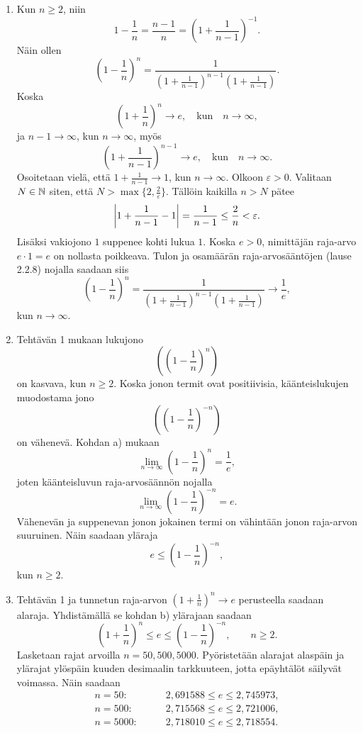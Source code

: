 \documentclass[11pt,a4paper]{amsart}
\begin{document}
\begin{solution}
\leavevmode\par
\begin{enumerate}[label=\alph*), nosep]
\item Kun \(n \geq 2\), niin
  \[
    1 - \frac{1}{n} = \frac{n - 1}{n} = \left(1 + \frac{1}{n - 1}\right)^{-1}.
  \]
  Näin ollen
  \[
    \left(1 - \frac{1}{n}\right)^n = \frac{1}{
      \left(1 + \frac{1}{n - 1}\right)^{n - 1}\left(1 + \frac{1}{n - 1}\right)
    }.
  \]
  Koska
  \[
    \left(1 + \frac{1}{n}\right)^n \to e, \quad \text{kun} \quad n \to \infty,
  \]
  ja \(n - 1 \to \infty\), kun \(n \to \infty\), myös
  \[
    \left(1 + \frac{1}{n - 1}\right)^{n - 1} \to e, \quad \text{kun}
    \quad n \to \infty.
  \]
  Osoitetaan vielä, että \(1 + \frac{1}{n - 1} \to 1\), kun \(n \to \infty\).
  Olkoon \(\varepsilon > 0\). Valitaan \(N \in \NN\) siten, että
  \(N > \max\{2, \frac{2}{\varepsilon}\}\). Tällöin kaikilla \(n > N\) pätee
  \[
    \abs*{1 + \frac{1}{n - 1} - 1} = \frac{1}{n - 1} \leq \frac{2}{n}
    < \varepsilon.
  \]
  Lisäksi vakiojono \(1\) suppenee kohti lukua \(1\).
  Koska \(e > 0\), nimittäjän raja-arvo \(e \cdot 1 = e\) on nollasta
  poikkeava. Tulon ja osamäärän raja-arvosääntöjen (lause 2.2.8) nojalla
  saadaan siis
  \[
    \left(1 - \frac{1}{n}\right)^n = \frac{1}{
      \left(1 + \frac{1}{n - 1}\right)^{n - 1}\left(1 + \frac{1}{n - 1}\right)
    } \to \frac{1}{e},
  \]
  kun \(n \to \infty\).
\item Tehtävän 1 mukaan lukujono
  \[
    \left(\left(1 - \frac{1}{n}\right)^n\right)
  \]
  on kasvava, kun \(n \geq 2\). Koska jonon termit ovat positiivisia,
  käänteislukujen muodostama jono
  \[
    \left(\left(1 - \frac{1}{n}\right)^{-n}\right)
  \]
on vähenevä. Kohdan a) mukaan
\[
  \lim_{n \to \infty} \left(1 - \frac{1}{n}\right)^n =
  \frac{1}{e},
\]
joten käänteisluvun raja-arvosäännön nojalla
\[
  \lim_{n \to \infty} \left(1 - \frac{1}{n}\right)^{-n} = e.
\]
Vähenevän ja suppenevan jonon jokainen termi on vähintään jonon
raja-arvon suuruinen. Näin saadaan yläraja
\[
  e \leq \left(1 - \frac{1}{n}\right)^{-n},
\]
kun \(n \geq 2\).
\item Tehtävän 1 ja tunnetun raja-arvon
\(\left(1 + \frac{1}{n}\right)^n \to e\) perusteella saadaan alaraja.
Yhdistämällä se kohdan b) ylärajaan saadaan
\[
\left(1 + \frac{1}{n}\right)^n \leq e
\leq \left(1 - \frac{1}{n}\right)^{-n}, \qquad n \geq 2.
\]
Lasketaan rajat arvoilla \(n = 50, 500, 5000\). Pyöristetään alarajat
alaspäin ja ylärajat ylöspäin kuuden desimaalin tarkkuuteen, jotta
epäyhtälöt säilyvät voimassa. Näin saadaan
\[
\begin{aligned}
  n = 50:   &\qquad 2{,}691588 \leq e \leq 2{,}745973, \\
  n = 500:  &\qquad 2{,}715568 \leq e \leq 2{,}721006, \\
  n = 5000: &\qquad 2{,}718010 \leq e \leq 2{,}718554.
\end{aligned}
\]
\end{enumerate}
\end{solution}
\end{document}
